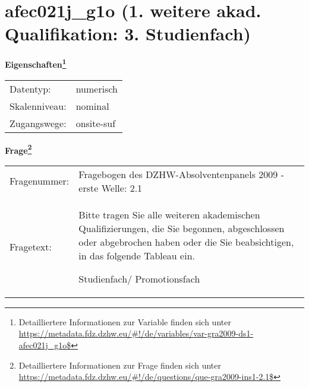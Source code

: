 
    \setcounter{footnote}{0}

    \vspace*{-1.8cm}
	\section{afec021j\_g1o (1. weitere akad. Qualifikation: 3. Studienfach)}
	\label{section:afec021j_g1o}



    \vspace*{0.5cm}
    \noindent\textbf{Eigenschaften\footnote{Detailliertere Informationen zur Variable finden sich unter
		\url{https://metadata.fdz.dzhw.eu/\#!/de/variables/var-gra2009-ds1-afec021j_g1o$}}}\\
	\begin{tabularx}{\hsize}{@{}lX}
	Datentyp: & numerisch \\
	Skalenniveau: & nominal \\
	Zugangswege: &
	  onsite-suf
 \\
    \end{tabularx}



				\vspace*{0.5cm}
                \noindent\textbf{Frage\footnote{Detailliertere Informationen zur Frage finden sich unter
		              \url{https://metadata.fdz.dzhw.eu/\#!/de/questions/que-gra2009-ins1-2.1$}}}\\
				\begin{tabularx}{\hsize}{@{}lX}
					Fragenummer: &
					  Fragebogen des DZHW-Absolventenpanels 2009 - erste Welle:
					  2.1
 \\
					Fragetext: & Bitte tragen Sie alle weiteren akademischen Qualifizierungen, die Sie begonnen, abgeschlossen oder abgebrochen haben oder die Sie beabsichtigen, in das folgende Tableau ein.\par  Studienfach/ Promotionsfach \\
				\end{tabularx}






